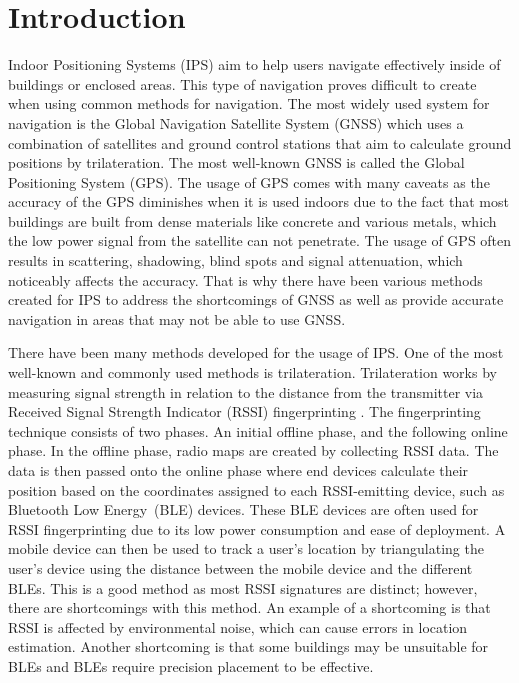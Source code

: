 \documentclass[runningheads]{llncs}
\begin{document}
\section{Introduction}
Indoor Positioning Systems (IPS) aim to help users navigate effectively inside of buildings or enclosed areas. This type of navigation proves difficult to create when using common methods for navigation. The most widely used system for navigation is the Global Navigation Satellite System (GNSS) which uses a combination of satellites and ground control stations that aim to calculate ground positions by trilateration. The most well-known GNSS is called the Global Positioning System (GPS). The usage of GPS comes with many caveats as the accuracy of the GPS diminishes when it is used indoors due to the fact that most buildings are built from dense materials like concrete and various metals, which the low power signal from the satellite can not penetrate. The usage of GPS often results in scattering, shadowing, blind spots and signal attenuation, which noticeably affects the accuracy\cite{bgp1}. That is why there have been various methods created for IPS to address the shortcomings of GNSS as well as provide accurate navigation in areas that may not be able to use GNSS.

There have been many methods developed for the usage of IPS. One of the most well-known and commonly used methods is trilateration. Trilateration works by measuring signal strength in relation to the distance from the transmitter via Received Signal Strength Indicator (RSSI) fingerprinting \cite{bg2}. The fingerprinting technique consists of two phases. An initial offline phase, and the following online phase. In the offline phase, radio maps are created by collecting RSSI data. The data is then passed onto the online phase where end devices calculate their position based on the coordinates assigned to each RSSI-emitting device, such as Bluetooth Low Energy~(BLE) devices. These BLE devices are often used for RSSI fingerprinting due to its low power consumption and ease of deployment. A mobile device can then be used to track a user's location by triangulating the user's device using the distance between the mobile device and the different BLEs. This is a good method as most RSSI signatures are distinct; however, there are shortcomings with this method. An example of a shortcoming is that RSSI is affected by environmental noise, which can cause errors in location estimation\cite{bgp2}. Another shortcoming is that some buildings may be unsuitable for BLEs and BLEs require precision placement to be effective.
\end{document}
